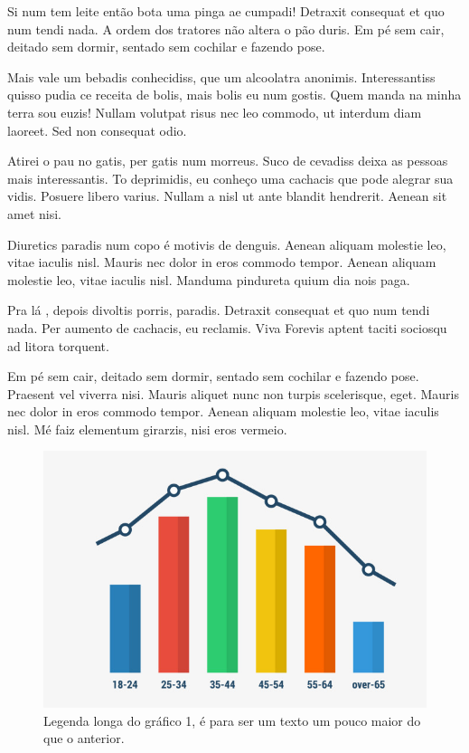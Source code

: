 \documentclass{article}
\begin{document}
	Si num tem leite então bota uma pinga ae cumpadi! Detraxit consequat et quo num tendi nada. A ordem dos tratores não altera o pão duris. Em pé sem cair, deitado sem dormir, sentado sem cochilar e fazendo pose.
	
	Mais vale um bebadis conhecidiss, que um alcoolatra anonimis. Interessantiss quisso pudia ce receita de bolis, mais bolis eu num gostis. Quem manda na minha terra sou euzis! Nullam volutpat risus nec leo commodo, ut interdum diam laoreet. Sed non consequat odio.
	
	Atirei o pau no gatis, per gatis num morreus. Suco de cevadiss deixa as pessoas mais interessantis. To deprimidis, eu conheço uma cachacis que pode alegrar sua vidis. Posuere libero varius. Nullam a nisl ut ante blandit hendrerit. Aenean sit amet nisi.
	
	Diuretics paradis num copo é motivis de denguis. Aenean aliquam molestie leo, vitae iaculis nisl. Mauris nec dolor in eros commodo tempor. Aenean aliquam molestie leo, vitae iaculis nisl. Manduma pindureta quium dia nois paga.
	
	Pra lá , depois divoltis porris, paradis. Detraxit consequat et quo num tendi nada. Per aumento de cachacis, eu reclamis. Viva Forevis aptent taciti sociosqu ad litora torquent.
	
	Em pé sem cair, deitado sem dormir, sentado sem cochilar e fazendo pose. Praesent vel viverra nisi. Mauris aliquet nunc non turpis scelerisque, eget. Mauris nec dolor in eros commodo tempor. Aenean aliquam molestie leo, vitae iaculis nisl. Mé faiz elementum girarzis, nisi eros vermeio.
	
	
	\begin{figure}[H] 
		\centering
		\includegraphics[width=0.7\linewidth]{images/grafico1}
		\caption[Legenda curta do gráfico 1]{Legenda longa do gráfico 1, é para ser um texto um pouco maior do que o anterior.}
		\label{fig:grafico1}
	\end{figure}
	
\end{document}
